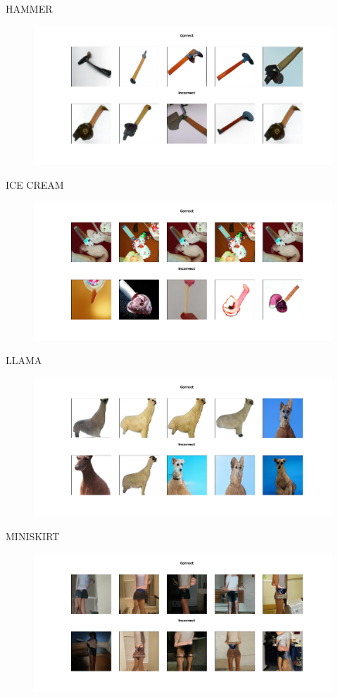 \documentclass[11pt,a4paper,openany]{book}
\begin{document}
\newline
HAMMER
\begin{figure}[ht!]
    \centering
    \includegraphics[scale=0.4]{figs/imagenet_examples/hammer.png}
\end{figure}
\newpage
\noindent ICE CREAM
\begin{figure}[ht!]
    \centering
    \includegraphics[scale=0.4]{figs/imagenet_examples/ice cream.png}
\end{figure}
\newline
LLAMA
\begin{figure}[ht!]
    \centering
    \includegraphics[scale=0.4]{figs/imagenet_examples/llama.png}
\end{figure}
\newpage
\noindent MINISKIRT
\begin{figure}[ht!]
    \centering
    \includegraphics[scale=0.4]{figs/imagenet_examples/miniskirt.png}
\end{figure}
\end{document}
